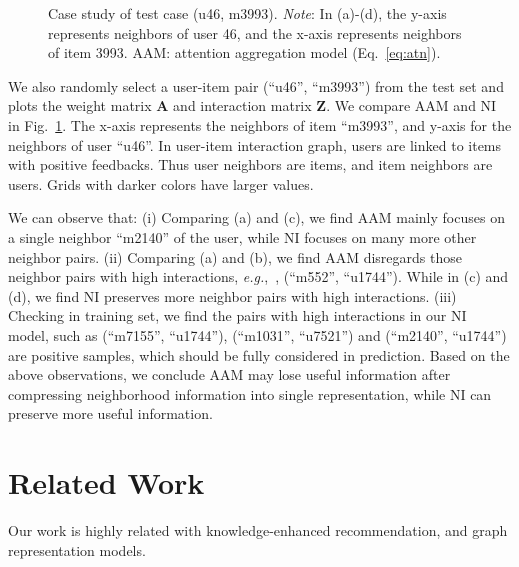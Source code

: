\documentclass[sigconf]{acmart}
\newcommand{\eg}{\emph{e.g.},~}
\begin{document}
\begin{figure}
    \caption{Case study of test case (u46, m3993). \emph{Note}: In (a)-(d), the y-axis represents neighbors of user 46, and the x-axis represents neighbors of item 3993. AAM: attention aggregation model (Eq.~\eqref{eq:atn}).}
    \label{fig:case}
\end{figure}

We also randomly select a user-item pair (``u46'', ``m3993'') from the test set and plots the weight matrix $\mathbf{A}$ and interaction matrix $\mathbf{Z}$. We compare AAM and NI in Fig.~\ref{fig:case}. The x-axis represents the neighbors of item ``m3993'', and y-axis for the neighbors of user ``u46''. In user-item interaction graph, users are linked to items with positive feedbacks. Thus user neighbors are items, and item neighbors are users. Grids with darker colors have larger values.

We can observe that:
(i) Comparing (a) and (c), we find AAM mainly focuses on a single neighbor ``m2140'' of the user, while NI focuses on many more other neighbor pairs. 
(ii) Comparing (a) and (b), we find AAM disregards those neighbor pairs with high interactions, \eg, (``m552'', ``u1744''). While in (c) and (d), we find NI preserves more neighbor pairs with high interactions.
(iii) Checking in training set, we find the pairs with high interactions in our NI model, such as (``m7155'', ``u1744''), (``m1031'', ``u7521'') and (``m2140'', ``u1744'') are positive samples, which should be fully considered in prediction. 
Based on the above observations, we conclude AAM may lose useful information after compressing neighborhood information into single representation, while NI can preserve more useful information. 



\section{Related Work} \label{sec:re}
Our work is highly related with knowledge-enhanced recommendation, and graph representation models. 
\end{document}
